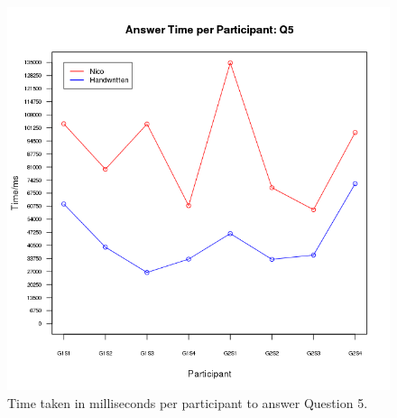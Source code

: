 \documentclass[12pt,twoside,notitlepage,xetex]{report}
\begin{document}
{\begin{center}
\begin{figure}[H]
\begin{center}
\includegraphics[height=\textheight/2-2cm]{figs/graphs/q5.png}
\end{center}
\caption{Time taken in milliseconds per participant to answer Question 5.}
\end{figure}
\end{center}

}
\end{document}
